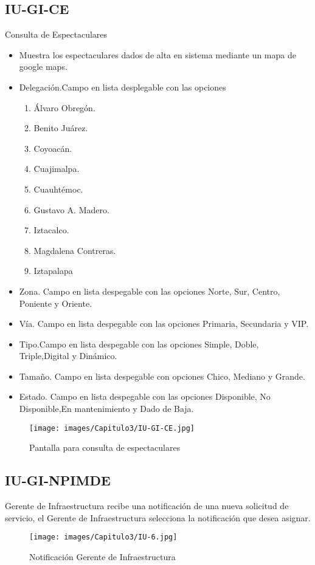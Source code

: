 \subsection{IU-GI-CE}
    Consulta de Espectaculares
\begin{itemize}
    \item Muestra los espectaculares dados de alta en sistema mediante un mapa de google maps.
    \item Delegación.Campo en lista desplegable con las opciones
    \begin{enumerate}
        \item Álvaro Obregón.
        \item Benito Juárez.
        \item Coyoacán.
        \item Cuajimalpa.
        \item Cuauhtémoc.
        \item Gustavo A. Madero.
        \item Iztacalco.
        \item Magdalena Contreras.
        \item Iztapalapa
    \end{enumerate}
    \item Zona. Campo en lista despegable con las opciones Norte, Sur, Centro, Poniente y Oriente.
    \item Vía. Campo en lista despegable con las opciones Primaria, Secundaria y VIP.
    \item Tipo.Campo en lista despegable con las opciones Simple, Doble, Triple,Digital y Dinámico.
    \item Tamaño. Campo en lista despegable con opciones Chico, Mediano y Grande.
    \item Estado. Campo en lista despegable con las opciones Disponible, No Disponible,En mantenimiento y Dado de Baja.
    
\end{itemize}
\begin{figure}[htbp!]
    \centering
    \texttt{[image: images/Capitulo3/IU-GI-CE.jpg]}
    \caption{Pantalla para consulta de espectaculares}
    \label{fig:my_label}
\end{figure}
\clearpage

\subsection{IU-GI-NPIMDE}
    Gerente de Infraestructura  recibe una notificación de una nueva solicitud de servicio, el Gerente de Infraestructura selecciona la notificación que desea asignar.
    \begin{figure}[htbp!]
    \centering
    \texttt{[image: images/Capitulo3/IU-6.jpg]}
    \caption{Notificación Gerente de Infraestructura}
    \label{fig:my_label}
\end{figure}
\clearpage

